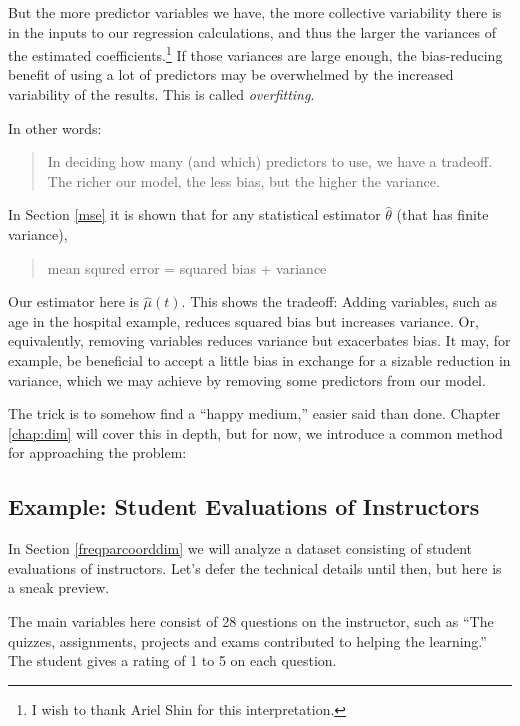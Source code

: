But the more predictor variables we have, the more collective
variability there is in the inputs to our regression calculations, and
thus the larger the variances of the estimated coefficients.\footnote{I
wish to thank Ariel Shin for this interpretation.}  If those variances
are large enough, the bias-reducing benefit of using a lot of predictors
may be overwhelmed by the increased variability of the results.  This is
called {\it overfitting}.

In other words:

\begin{quote}

In deciding how many (and which) predictors to use, we have a tradeoff.
The richer our model, the less bias, but the higher the variance.

\end{quote}

In Section \ref{mse} it is shown that for any statistical estimator
$\widehat{\theta}$ (that has finite variance),

\begin{quote}
mean squred error = squared bias + variance
\end{quote}

Our estimator here is $\widehat{\mu}(t)$.  This shows the tradeoff:
Adding variables, such as age in the hospital example, reduces squared
bias but increases variance.  Or, equivalently, removing variables
reduces variance but exacerbates bias.  It may, for example, be beneficial
to accept a little bias in exchange for a sizable reduction in variance,
which we may achieve by removing some predictors from our model.

The trick is to somehow find a ``happy medium,'' easier said than done.
Chapter \ref{chap:dim} will cover this in depth, but for now, we
introduce a common method for approaching the problem:

\subsection{Example:  Student Evaluations of Instructors}

In Section \ref{freqparcoorddim} we will analyze a dataset consisting of
student evaluations of instructors.  Let's defer the technical details
until then, but here is a sneak preview.

The main variables here consist of 28 questions on the instructor, such
as ``The quizzes, assignments, projects and exams contributed to helping
the learning.''  The student gives a rating of 1 to 5 on each question.


